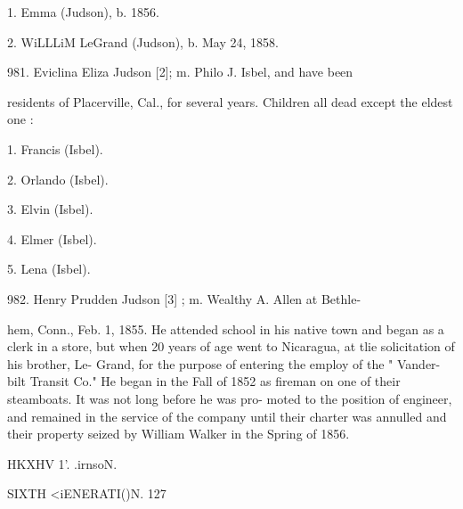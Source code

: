 \documentclass{book}
\begin{document}
1. Emma (Judson), b. 1856. 

2. WiLLLiM LeGrand (Judson), b. May 24, 1858. 

981. Eviclina Eliza Judson [2]; m. Philo J. Isbel, and have been 

residents of Placerville, Cal., for several years. Children all 
dead except the eldest one : 

1. Francis (Isbel). 

2. Orlando (Isbel). 

3. Elvin (Isbel). 

4. Elmer (Isbel). 

5. Lena (Isbel). 

982. Henry Prudden Judson [3] ; m. Wealthy A. Allen at Bethle- 

hem, Conn., Feb. 1, 1855. He attended school in his native 
town and began as a clerk in a store, but when 20 years of 
age went to Nicaragua, at tlie solicitation of his brother, Le- 
Grand, for the purpose of entering the employ of the " Vander- 
bilt Transit Co." He began in the Fall of 1852 as fireman on 
one of their steamboats. It was not long before he was pro- 
moted to the position of engineer, and remained in the service 
of the company until their charter was annulled and their 
property seized by William Walker in the Spring of 1856. 




HKXHV 1'. .irnsoN. 



SIXTH <iENERATI()N. 127 
\end{document}
